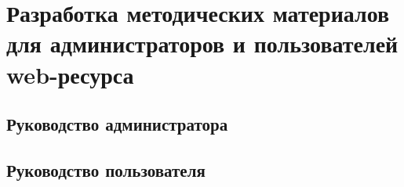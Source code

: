 \section{Разработка методических материалов для администраторов и пользователей web-ресурса}
    \subsection{Руководство администратора}
    \subsection{Руководство пользователя}

\clearpage
